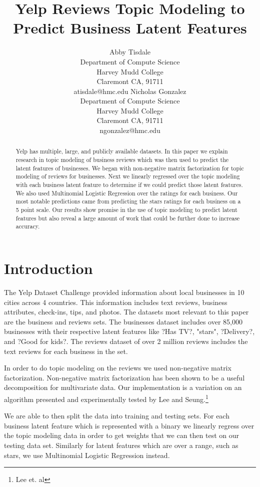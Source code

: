 \documentclass{article}
\title{Yelp Reviews Topic Modeling to Predict Business Latent Features}
\author{Abby Tisdale \\ Department of Compute Science \\ Harvey Mudd College \\Claremont CA, 91711 \\ atisdale@hmc.edu \And Nicholas Gonzalez \\ Department of Compute Science \\ Harvey Mudd College \\Claremont CA, 91711 \\ ngonzalez@hmc.edu}
\begin{document}
\maketitle

\begin{abstract}
  Yelp has multiple, large, and publicly available datasets.  In this paper we explain research in topic modeling of business reviews which was then used to predict the latent features of businesses.  We began with non-negative matrix factorization for topic modeling of reviews for businesses.  Next we linearly regressed over the topic modeling with each business latent feature to determine if we could predict those latent features.  We also used Multinomial Logistic Regression over the ratings for each business.  Our most notable predictions came from predicting the stars ratings for each business on a 5 point scale.  Our results show promise in the use of topic modeling to predict latent features but also reveal a large amount of work that could be further done to increase accuracy.
\end{abstract}

\section{Introduction}


The Yelp Dataset Challenge provided information about local businesses in 10 cities across 4 countries.  This information includes text reviews, business attributes, check-ins, tips, and photos.  The datasets most relevant to this paper are the business and reviews sets.  The businesses dataset includes over 85,000 businesses with their respective latent features like ?Has TV?, "stars", ?Delivery?, and ?Good for kids?.  The reviews dataset of over 2 million reviews includes the text reviews for each business in the set. 


In order to do topic modeling on the reviews we used non-negative matrix factorization.  Non-negative matrix factorization has been shown to be a useful decomposition for multivariate data.  Our implementation is a variation on an algorithm presented and experimentally tested by Lee and Seung.\footnote{Lee et. al}


We are able to then split the data into training and testing sets.  For each business latent feature which is represented with a binary we linearly regress over the topic modeling data in order to get weights that we can then test on our testing data set.  Similarly for latent features which are over a range, such as stars, we use Multinomial Logistic Regression instead.
\end{document}
